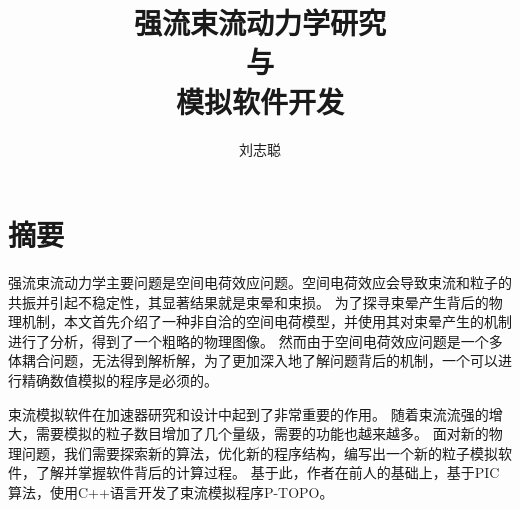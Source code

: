   \confidential{}%
  \title[强流束流动力学研究与模拟软件开发]{强流束流动力学研究\\与\\模拟软件开发}%
  \author{刘志聪}%
\maketitle
\makeenglishtitle
\makedeclaration
\chapter{摘\quad 要}%

强流束流动力学主要问题是空间电荷效应问题。空间电荷效应会导致束流和粒子的共振并引起不稳定性，其显著结果就是束晕和束损。
为了探寻束晕产生背后的物理机制，本文首先介绍了一种非自洽的空间电荷模型，并使用其对束晕产生的机制进行了分析，得到了一个粗略的物理图像。
然而由于空间电荷效应问题是一个多体耦合问题，无法得到解析解，为了更加深入地了解问题背后的机制，一个可以进行精确数值模拟的程序是必须的。

束流模拟软件在加速器研究和设计中起到了非常重要的作用。
随着束流流强的增大，需要模拟的粒子数目增加了几个量级，需要的功能也越来越多。
面对新的物理问题，我们需要探索新的算法，优化新的程序结构，编写出一个新的粒子模拟软件，了解并掌握软件背后的计算过程。
基于此，作者在前人的基础上，基于PIC算法，使用C++语言开发了束流模拟程序P-TOPO。


